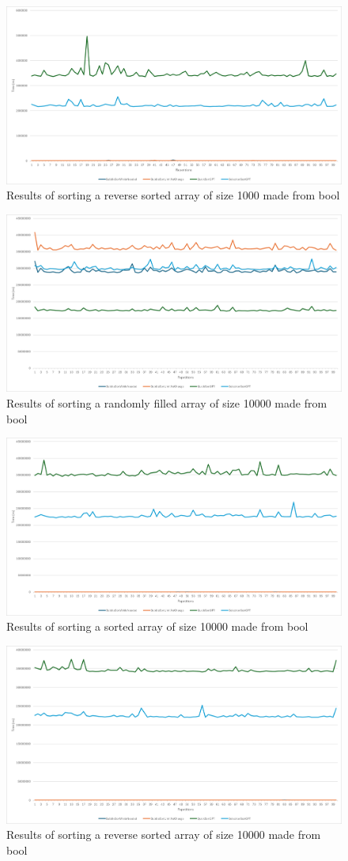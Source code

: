 \documentclass{article}
\begin{document}
    \begin{figure}[!h]
        \centering
        \includegraphics[width=0.7\linewidth]{bool_1000_reverse_sorted.png}
        \caption{Results of sorting a reverse sorted array of size 1000 made from bool}
        \label{fig:bool_1000_reverse_sorted}
    \end{figure}
    
    \begin{figure}[!h]
        \centering
        \includegraphics[width=0.7\linewidth]{bool_10000_random.png}
        \caption{Results of sorting a randomly filled array of size 10000 made from bool}
        \label{fig:bool_10000_random}
    \end{figure}
    
    \begin{figure}[!h]
        \centering
        \includegraphics[width=0.7\linewidth]{bool_10000_sorted.png}
        \caption{Results of sorting a sorted array of size 10000 made from bool}
        \label{fig:bool_10000_sorted}
    \end{figure}
    
    \begin{figure}[!h]
        \centering
        \includegraphics[width=0.7\linewidth]{bool_10000_reverse_sorted.png}
        \caption{Results of sorting a reverse sorted array of size 10000 made from bool}
        \label{fig:bool_10000_reverse_sorted}
    \end{figure}
    
    \clearpage
\end{document}
